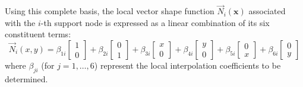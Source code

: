 \documentclass[preprint,12pt]{elsarticle}
\begin{document}
Using this complete basis, the local vector shape function $\vec{N}_i(\mathbf{x})$ associated with the $i$-th support node is expressed as a linear combination of its six constituent terms:
\begin{equation}
    \vec{N}_i(x, y) = \beta_{1i} \begin{bmatrix} 1 \\ 0 \end{bmatrix} + \beta_{2i} \begin{bmatrix} 0 \\ 1 \end{bmatrix} + \beta_{3i} \begin{bmatrix} x \\ 0 \end{bmatrix} + \beta_{4i} \begin{bmatrix} y \\ 0 \end{bmatrix} + \beta_{5i} \begin{bmatrix} 0 \\ x \end{bmatrix} + \beta_{6i} \begin{bmatrix} 0 \\ y \end{bmatrix}
    \label{eq:P1_shape_function_expansion}
\end{equation}
where $\beta_{ji}$ (for $j=1, \dots, 6$) represent the local interpolation coefficients to be determined.
\end{document}

